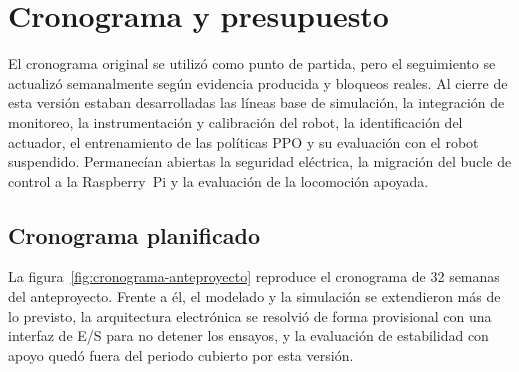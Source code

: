 \chapter{Cronograma y presupuesto}

El cronograma original se utilizó como punto de partida, pero el seguimiento
se actualizó semanalmente según evidencia producida y bloqueos reales. Al cierre
de esta versión estaban desarrolladas las líneas base de simulación, la
integración de monitoreo, la instrumentación y calibración del robot, la
identificación del actuador, el entrenamiento de las políticas PPO y su
evaluación con el robot suspendido. Permanecían abiertas la seguridad
eléctrica, la migración del bucle de control a la Raspberry~Pi y la evaluación
de la locomoción apoyada.

\section{Cronograma planificado}

La figura~\ref{fig:cronograma-anteproyecto} reproduce el cronograma de 32
semanas del anteproyecto. Frente a él, el modelado y la simulación se
extendieron más de lo previsto, la arquitectura electrónica se resolvió de forma
provisional con una interfaz de E/S para no detener los ensayos, y la
evaluación de estabilidad con apoyo quedó fuera del periodo cubierto por esta
versión.


